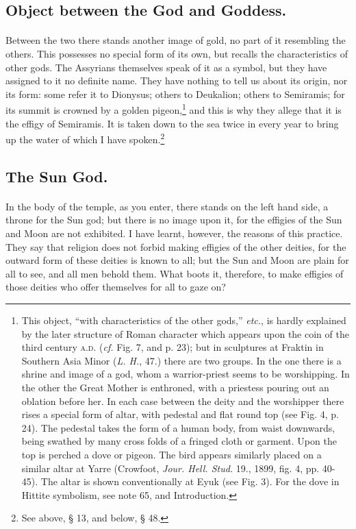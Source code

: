\documentclass[a4paper, 11pt, oneside, polutonikogreek, english]{article}
\begin{document}
\subsection{Object between the God and Goddess.}
\paragraph{}
Between the two there stands another image of gold, no part of it resembling the others. This possesses no special form of its own, but recalls the characteristics of other gods. The Assyrians themselves speak of it as a symbol, but they have assigned to it no definite name. They have nothing to tell us about its origin, nor its form: some refer it to Dionysus; others to Deukalion; others to Semiramis; for its summit is crowned by a golden pigeon,\footnote{This object, ``with characteristics of the other gods,'' \emph{etc.}, is hardly explained by the later structure of Roman character which appears upon the coin of the third century \textsc{a.d.} (\emph{cf.} Fig. 7, and p. 23); but in sculptures at Fraktin in Southern Asia Minor (\emph{L. H.}, 47.) there are two groups. In the one there is a shrine and image of a god, whom a warrior-priest seems to be worshipping. In the other the Great Mother is enthroned, with a priestess pouring out an oblation before her. In each case between the deity and the worshipper there rises a special form of altar, with pedestal and flat round top (see Fig. 4, p. 24). The pedestal takes the form of a human body, from waist downwards, being swathed by many cross folds of a fringed cloth or garment. Upon the top is perched a dove or pigeon. The bird appears similarly placed on a similar altar at Yarre (Crowfoot, \emph{Jour. Hell. Stud.} 19., 1899, fig. 4, pp. 40-45). The altar is shown conventionally at Eyuk (see Fig. 3). For the dove in Hittite symbolism, see note 65, and Introduction.} and this is why they allege that it is the effigy of Semiramis. It is taken down to the sea twice in every year to bring up the water of which I have spoken.\footnote{See above, § 13, and below, § 48.}

\subsection{The Sun God.}
\paragraph{}
In the body of the temple, as you enter, there stands on the left hand side, a throne for the Sun god; but there is no image upon it, for the effigies of the Sun and Moon are not exhibited. I have learnt, however, the reasons of this practice. They say that religion does not forbid making effigies of the other deities, for the outward form of these deities is known to all; but the Sun and Moon are plain for all to see, and all men behold them. What boots it, therefore, to make effigies of those deities who offer themselves for all to gaze on?
\end{document}
